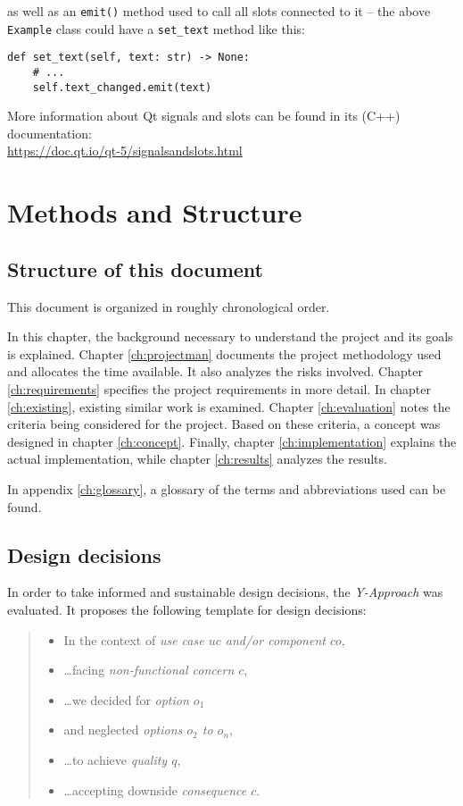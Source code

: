 as well as an \verb|emit()| method used to call all slots connected to it -- the
above \verb|Example| class could have a \verb|set_text| method like this:

\begin{verbatim}
def set_text(self, text: str) -> None:
    # ...
    self.text_changed.emit(text)
\end{verbatim}

More information about Qt signals and slots can be found in its (C++)
documentation: \\
\url{https://doc.qt.io/qt-5/signalsandslots.html}

\section{Methods and Structure}
\subsection{Structure of this document}
This document is organized in roughly chronological order.

In this chapter, the background necessary to understand the
project and its goals is explained. Chapter \ref{ch:projectman} documents the
project methodology used and allocates the time available.
It also analyzes the risks involved. Chapter \ref{ch:requirements} specifies the
project requirements in more detail. In chapter \ref{ch:existing}, existing
similar work is examined. Chapter \ref{ch:evaluation} notes the criteria being
considered for the project. Based on these criteria, a concept was designed in chapter
\ref{ch:concept}. Finally, chapter \ref{ch:implementation} explains the actual
implementation, while chapter \ref{ch:results} analyzes the results.

In appendix \ref{ch:glossary}, a glossary of the terms and abbreviations used
can be found.

\subsection{Design decisions}
In order to take informed and sustainable design decisions, the
\emph{Y-Approach} \autocite{yapproach} was evaluated. It proposes the following
template for design decisions:

\begin{quote}
  \begin{itemize}[parsep=5pt]
    \item In the context of \emph{use case $uc$ and/or component $co$},
    \item \ldots facing \emph{non-functional concern $c$},
    \item \ldots we decided for \emph{option $o_1$}
    \item and neglected \emph{options $o_2$ to $o_n$},
    \item \ldots to achieve \emph{quality $q$},
    \item \ldots accepting downside \emph{consequence $c$}.
  \end{itemize}
\end{quote}

